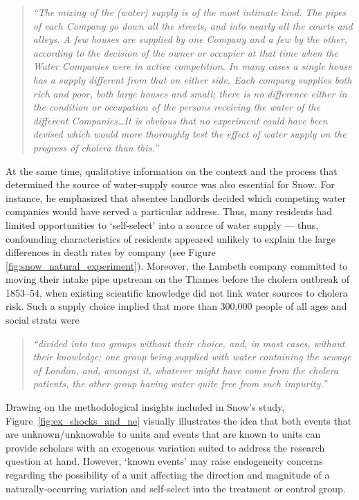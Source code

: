 \documentclass[11pt]{article}
\begin{document}
\begin{refsection}
\begin{quote}
  \textit{
  ``The mixing of the (water) supply is of the most intimate kind. The pipes of
  each Company go down all the streets, and into nearly all the courts and
  alleys. A few houses are supplied by one Company and a few by the other,
  according to the decision of the owner or occupier at that time when the Water
  Companies were in active competition. In many cases a single house has a
  supply different from that on either side. Each company supplies both rich and
  poor, both large houses and small; there is no difference either in the
  condition or occupation of the persons receiving the water of the different
  Companies\ldots It is obvious that no experiment could have been devised which
  would more thoroughly test the effect of water supply on the progress of
  cholera than this.''
  }
  \autocite[][pages 74 - 75]{snow_1855}
\end{quote}

At the same time, qualitative information on the context and the process that
determined the source of water-supply source was also essential for Snow.  For
instance, he emphasized that absentee landlords decided which competing water
companies would have served a particular address.  Thus, many residents had
limited opportunities to `self-select' into a source of water supply --- thus,
confounding characteristics of residents appeared unlikely to explain the large
differences in death rates by company (see Figure
\ref{fig:snow_natural_experiment}).  Moreover,  the Lambeth company committed to
moving their intake pipe upstream on the Thames before the cholera outbreak of
1853–54, when existing scientific knowledge did not link water sources to
cholera risk.  Such a supply choice implied that more than 300,000 people of all
ages and social strata were

\begin{quote}
  \textit{``divided into two groups without their choice, and, in most cases, 
  without their knowledge; one group being supplied with water containing the 
  sewage of London, and, amongst it, whatever might have come from the cholera 
  patients, the other group having water quite free from such impurity.''}
  \autocite[][pages 74–75]{snow_1855}
\end{quote}

Drawing on the methodological insights included in Snow's study, 
Figure~\ref{fig:ex_shocks_and_ne} visually illustrates the idea that both
events that are unknown/unknowable to units and events that are known to units
can provide scholars with an exogenous variation suited to address the research
question at hand.  However, `known events' may raise endogeneity concerns
regarding the possibility of a unit affecting the direction and magnitude of a
naturally-occurring variation and self-select into the treatment or control
group.


\end{refsection}
\end{document}
